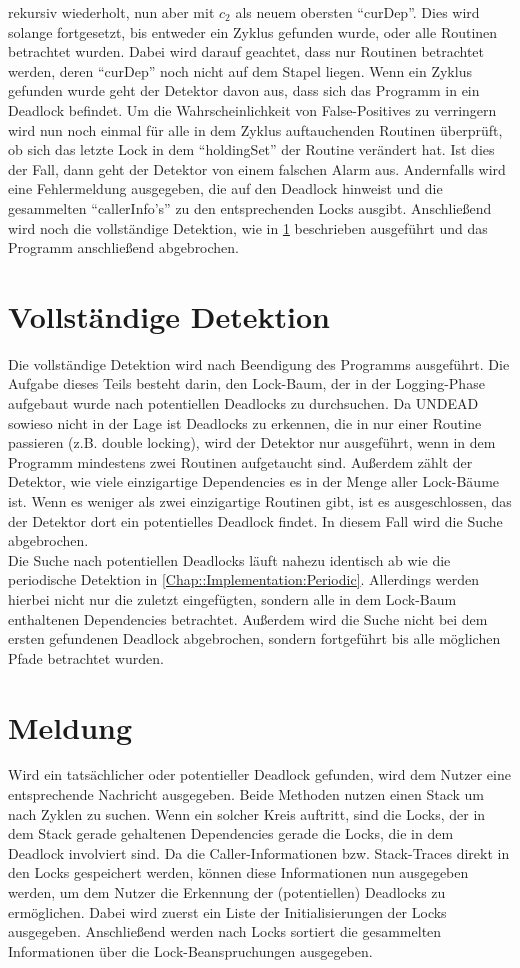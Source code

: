 rekursiv wiederholt, nun aber mit $c_2$ als neuem obersten ``curDep''. Dies wird
solange fortgesetzt, bis entweder ein Zyklus gefunden wurde, oder alle Routinen 
betrachtet wurden. Dabei wird darauf geachtet, dass nur Routinen betrachtet 
werden, deren ``curDep'' noch nicht auf dem Stapel liegen. Wenn ein Zyklus 
gefunden wurde geht der Detektor davon aus, dass sich das Programm in ein
Deadlock befindet. Um die Wahrscheinlichkeit von False-Positives zu verringern
wird nun noch einmal für alle in dem Zyklus auftauchenden Routinen überprüft,
ob sich das letzte Lock in dem ``holdingSet'' der Routine verändert hat. Ist dies 
der Fall, dann geht der Detektor von einem falschen Alarm aus. Andernfalls 
wird eine Fehlermeldung ausgegeben, die auf den Deadlock hinweist und die 
gesammelten ``callerInfo's'' zu den entsprechenden Locks ausgibt. Anschließend
wird noch die vollständige Detektion, wie in \ref{Chap::Implementation:Complete}
beschrieben ausgeführt und das Programm anschließend abgebrochen. 


\section{Vollständige Detektion} \label{Chap::Implementation:Complete}
Die vollständige Detektion wird nach Beendigung des Programms ausgeführt. 
Die Aufgabe dieses Teils besteht darin, den Lock-Baum, der in der Logging-Phase 
aufgebaut wurde nach potentiellen Deadlocks zu durchsuchen. Da UNDEAD 
sowieso nicht in
der Lage ist Deadlocks zu erkennen, die in nur einer Routine passieren (z.B. 
double locking), wird der Detektor nur ausgeführt, wenn in dem Programm 
mindestens zwei Routinen aufgetaucht sind. Außerdem zählt der Detektor, wie 
viele einzigartige Dependencies es in der Menge aller Lock-Bäume ist. Wenn es 
weniger als zwei einzigartige Routinen gibt, ist es ausgeschlossen, das 
der Detektor dort ein potentielles Deadlock findet. In diesem Fall wird die 
Suche abgebrochen.\\
Die Suche nach potentiellen Deadlocks läuft nahezu identisch ab wie die 
periodische Detektion
in \ref{Chap::Implementation:Periodic}. Allerdings werden hierbei nicht nur 
die zuletzt eingefügten, sondern alle in dem Lock-Baum enthaltenen Dependencies
betrachtet. Außerdem wird die Suche nicht bei dem ersten gefundenen Deadlock 
abgebrochen, sondern fortgeführt bis alle möglichen Pfade betrachtet wurden.


\section{Meldung}
Wird ein tatsächlicher oder potentieller Deadlock gefunden, wird dem Nutzer 
eine entsprechende Nachricht ausgegeben. Beide Methoden nutzen einen Stack um 
nach Zyklen zu suchen. Wenn ein solcher Kreis auftritt, sind die Locks, der in 
dem Stack gerade gehaltenen Dependencies gerade die Locks, die in dem Deadlock
involviert sind. Da die Caller-Informationen bzw. Stack-Traces direkt in den 
Locks gespeichert werden, können diese Informationen nun ausgegeben werden,
um dem Nutzer die Erkennung der (potentiellen) Deadlocks zu ermöglichen. 
Dabei wird zuerst ein Liste der Initialisierungen der Locks ausgegeben. 
Anschließend werden nach Locks sortiert die gesammelten Informationen über die 
Lock-Beanspruchungen ausgegeben.